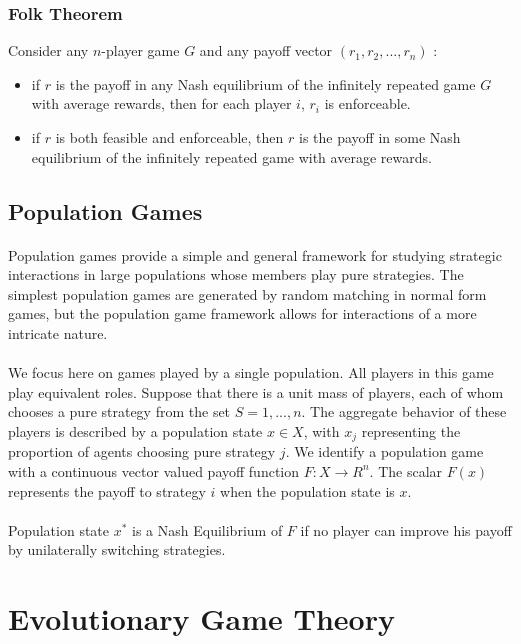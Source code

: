 \subsubsection{Folk Theorem}
Consider any $n$-player game $G$ and any payoff vector $(r_1, r_2, ...,r_n) $ :
\begin{itemize}
\item if $r$ is the payoff in any Nash equilibrium of the infinitely repeated game $G$ with average rewards, then for each player $i$,  $r_i$ is enforceable.
\item if $r$ is both feasible and enforceable, then $r$ is the payoff in some Nash equilibrium of the infinitely repeated game with average rewards.
\end{itemize}
\subsection{Population Games}
\paragraph{}Population games provide a simple and general framework for studying strategic interactions in large populations whose members play pure strategies. The simplest population games are generated by random matching in normal form games, but the population game framework allows for interactions of a more intricate nature.
\paragraph{}We focus here on games played by a single population. All players in this game play equivalent roles. Suppose that there is a unit mass of players, each of whom chooses a pure strategy from the set
 $S = {1, ... , n}$. The aggregate behavior of these players is described by a population state $x \in X$, with $x_j$ representing the proportion of agents choosing pure strategy $j$. We identify a population game with a continuous vector valued payoff function $ F:X \rightarrow R^n$. The scalar $F(x)$ represents the payoff to strategy $i$ when the population state is $x$.
\paragraph{}Population state $x^*$ is a Nash Equilibrium of $F$ if no player can improve his payoff by unilaterally switching strategies.
\section{Evolutionary Game Theory}

